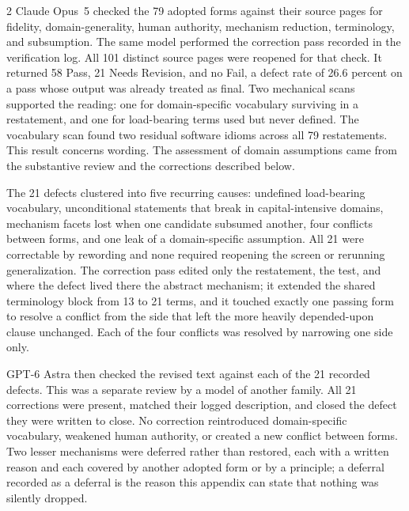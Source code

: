 \begin{multicols}{2}
Claude Opus~5 checked the 79 adopted forms against their source pages for fidelity, domain-generality, human authority, mechanism reduction, terminology, and subsumption. The same model performed the correction pass recorded in the verification log. All 101 distinct source pages were reopened for that check. It returned 58 Pass, 21 Needs Revision, and no Fail, a defect rate of 26.6 percent on a pass whose output was already treated as final. Two mechanical scans supported the reading: one for domain-specific vocabulary surviving in a restatement, and one for load-bearing terms used but never defined. The vocabulary scan found two residual software idioms across all 79 restatements. This result concerns wording. The assessment of domain assumptions came from the substantive review and the corrections described below.

The 21 defects clustered into five recurring causes: undefined load-bearing vocabulary, unconditional statements that break in capital-intensive domains, mechanism facets lost when one candidate subsumed another, four conflicts between forms, and one leak of a domain-specific assumption. All 21 were correctable by rewording and none required reopening the screen or rerunning generalization. The correction pass edited only the restatement, the test, and where the defect lived there the abstract mechanism; it extended the shared terminology block from 13 to 21 terms, and it touched exactly one passing form to resolve a conflict from the side that left the more heavily depended-upon clause unchanged. Each of the four conflicts was resolved by narrowing one side only.

GPT-6 Astra then checked the revised text against each of the 21 recorded defects. This was a separate review by a model of another family. All 21 corrections were present, matched their logged description, and closed the defect they were written to close. No correction reintroduced domain-specific vocabulary, weakened human authority, or created a new conflict between forms. Two lesser mechanisms were deferred rather than restored, each with a written reason and each covered by another adopted form or by a principle; a deferral recorded as a deferral is the reason this appendix can state that nothing was silently dropped.
\end{multicols}
